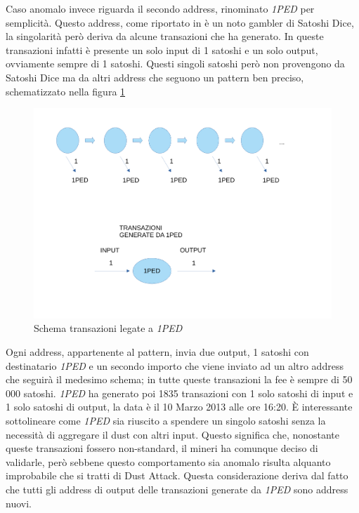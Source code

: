 Caso anomalo invece riguarda il secondo address, rinominato \textit{1PED} per semplicità. Questo address, come riportato in \cite{dustAnalisi} è un noto gambler di Satoshi Dice, la singolarità però deriva da alcune transazioni che ha generato. In queste transazioni infatti è presente un solo input di 1 satoshi e un solo output, ovviamente sempre di 1 satoshi. Questi singoli satoshi però non provengono da Satoshi Dice ma da altri address che seguono un pattern ben preciso, schematizzato nella figura \ref{fig:1PED}
\begin{figure}[h!]
    \centering
    \includegraphics[scale=0.4]{Images/1Ped.pdf}
    \caption{Schema transazioni legate a \textit{1PED}}
    \label{fig:1PED}
\end{figure}
\FloatBarrier
Ogni address, appartenente al pattern, invia due output, 1 satoshi con destinatario \textit{1PED} e un secondo importo che viene inviato ad un altro address che seguirà il medesimo schema; in tutte queste transazioni la fee è sempre di 50 000 satoshi. \textit{1PED} ha generato poi 1835 transazioni con 1 solo satoshi di input e 1 solo satoshi di output, la data è il 10 Marzo 2013 alle ore 16:20. È interessante sottolineare come \textit{1PED} sia riuscito a spendere un singolo satoshi senza la necessità di aggregare il dust con altri input. Questo significa che, nonostante queste transazioni fossero non-standard, il mineri ha comunque deciso di validarle, però sebbene questo comportamento sia anomalo risulta alquanto improbabile che si tratti di Dust Attack. Questa considerazione deriva dal fatto che tutti gli address di output delle transazioni generate da \textit{1PED} sono address nuovi.
